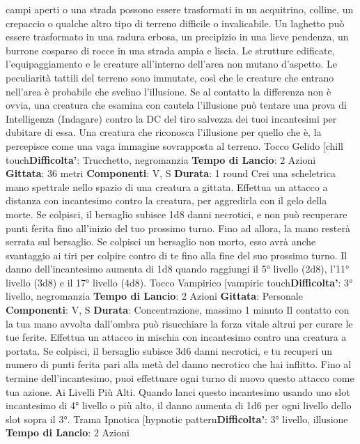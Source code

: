 \begin{multicols}{2}
campi aperti o una strada possono essere trasformati in
un acquitrino, colline, un crepaccio o qualche altro tipo
di terreno difficile o invalicabile. Un laghetto può essere
trasformato in una radura erbosa, un precipizio in una
lieve pendenza, un burrone cosparso di rocce in una
strada ampia e liscia. Le strutture edificate,
l’equipaggiamento e le creature all’interno dell’area non
mutano d’aspetto.
Le peculiarità tattili del terreno sono immutate, così che
le creature che entrano nell’area è probabile che
svelino l’illusione. Se al contatto la differenza non è
ovvia, una creatura che esamina con cautela l’illusione
può tentare una prova di Intelligenza (Indagare) contro
la DC del tiro salvezza dei tuoi incantesimi per dubitare
di essa. Una creatura che riconosca l’illusione per
quello che è, la percepisce come una vaga immagine
sovrapposta al terreno.
Tocco Gelido
[chill touch\textbf{Difficolta'}:
Trucchetto, negromanzia
\textbf{Tempo di Lancio}: 2 Azioni
\textbf{Gittata}: 36 metri
\textbf{Componenti}: V, S
\textbf{Durata}: 1 round
Crei una scheletrica mano spettrale nello spazio di una
creatura a gittata. Effettua un attacco a distanza con
incantesimo contro la creatura, per aggredirla con il
gelo della morte. Se colpisci, il bersaglio subisce 1d8
danni necrotici, e non può recuperare punti ferita fino
all’inizio del tuo prossimo turno. Fino ad allora, la mano
resterà serrata sul bersaglio.
Se colpisci un bersaglio non morto, esso avrà anche
svantaggio ai tiri per colpire contro di te fino alla fine del
suo prossimo turno.
Il danno dell’incantesimo aumenta di 1d8 quando
raggiungi il 5° livello (2d8), l’11° livello (3d8) e il 17°
livello (4d8).
Tocco Vampirico
[vampiric touch\textbf{Difficolta'}:
3° livello, negromanzia
\textbf{Tempo di Lancio}: 2 Azioni
\textbf{Gittata}: Personale
\textbf{Componenti}: V, S
\textbf{Durata}: Concentrazione, massimo 1 minuto
Il contatto con la tua mano avvolta dall’ombra può
risucchiare la forza vitale altrui per curare le tue ferite.
Effettua un attacco in mischia con incantesimo contro
una creatura a portata. Se colpisci, il bersaglio subisce
3d6 danni necrotici, e tu recuperi un numero di punti
ferita pari alla metà del danno necrotico che hai inflitto.
Fino al termine dell’incantesimo, puoi effettuare ogni
turno di nuovo questo attacco come tua azione.
Ai Livelli Più Alti. Quando lanci questo incantesimo
usando uno slot incantesimo di 4° livello o più alto, il
danno aumenta di 1d6 per ogni livello dello slot sopra il
3°.
Trama Ipnotica
[hypnotic pattern\textbf{Difficolta'}:
3° livello, illusione
\textbf{Tempo di Lancio}: 2 Azioni

\end{multicols}
